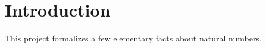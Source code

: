 \chapter{Introduction}
\label{chap:intro}

This project formalizes a few elementary facts about natural numbers.



